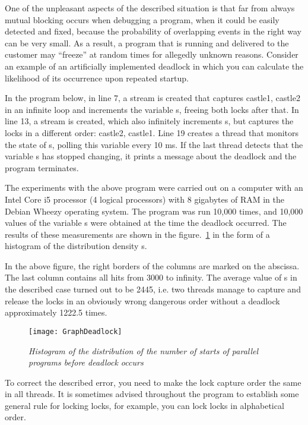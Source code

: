 {	\par One of the unpleasant aspects of the described situation is that far from always mutual blocking occurs when debugging a program, when it could be easily detected and fixed, because the probability of overlapping events in the right way can be very small. As a result, a program that is running and delivered to the customer may “freeze” at random times for allegedly unknown reasons. Consider an example of an artificially implemented deadlock in which you can calculate the likelihood of its occurrence upon repeated startup.
	\par In the program below, in line 7, a stream is created that captures castle1, castle2 in an infinite loop and increments the variable s, freeing both locks after that. In line 13, a stream is created, which also infinitely increments s, but captures the locks in a different order: castle2, castle1. Line 19 creates a thread that monitors the state of s, polling this variable every 10 ms. If the last thread detects that the variable s has stopped changing, it prints a message about the deadlock and the program terminates.
	\begin{figure}[H]
		
	\end{figure}
	\par The experiments with the above program were carried out on a computer with an Intel Core i5 processor (4 logical processors) with 8 gigabytes of RAM in the Debian Wheezy operating system. The program was run 10,000 times, and 10,000 values of the variable s were obtained at the time the deadlock occurred. The results of these measurements are shown in the figure.~\ref{GraphDeadlock:image} in the form of a histogram of the distribution density s.
	\par In the above figure, the right borders of the columns are marked on the abscissa. The last column contains all hits from 3000 to infinity. The average value of s in the described case turned out to be 2445, i.e. two threads manage to capture and release the locks in an obviously wrong dangerous order without a deadlock approximately 1222.5 times.
	\begin{figure}[H]
		\texttt{[image: GraphDeadlock]}
		\caption{\textit{Histogram of the distribution of the number of starts of parallel programs before deadlock occurs}}
		\label{GraphDeadlock:image}
	\end{figure}
	\par To correct the described error, you need to make the lock capture order the same in all threads. It is sometimes advised throughout the program to establish some general rule for locking locks, for example, you can lock locks in alphabetical order.
}
